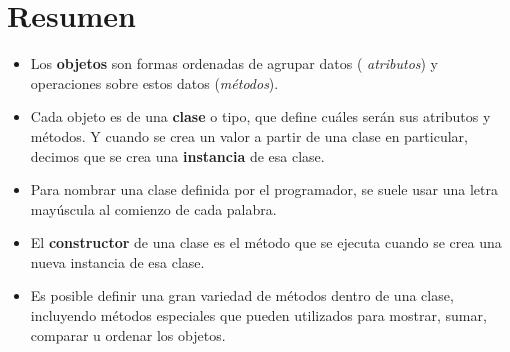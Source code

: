 \section{Resumen}

\begin{itemize}
\item Los {\bf objetos} son formas ordenadas de agrupar datos ({\it
atributos}) y operaciones sobre estos datos ({\it métodos}).

\item Cada objeto es de una {\bf clase} o tipo, que define cuáles
serán sus atributos y métodos. Y cuando se crea un valor a partir de una
clase en particular, decimos que se crea una {\bf instancia} de esa clase.

\item Para nombrar una clase definida por el programador, se suele usar una letra
mayúscula al comienzo de cada palabra.

\item El {\bf constructor} de una clase es el método que se ejecuta cuando
se crea una nueva instancia de esa clase.

\item Es posible definir una gran variedad de métodos dentro de una
clase, incluyendo métodos especiales que pueden utilizados para
mostrar, sumar, comparar u ordenar los objetos.
\end{itemize}

